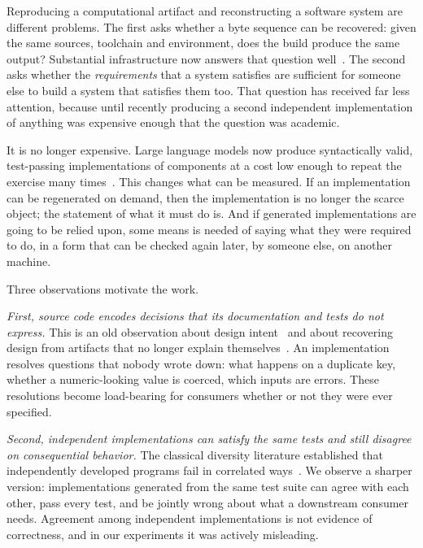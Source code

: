 \documentclass[10pt,twocolumn]{article}
\begin{document}
Reproducing a computational artifact and reconstructing a software system
are different problems. The first asks whether a byte sequence can be
recovered: given the same sources, toolchain and environment, does the
build produce the same output? Substantial infrastructure now answers
that question well~\cite{lamb2022,dolstra2004,courtes2013}. The second
asks whether the \emph{requirements} that a system satisfies are
sufficient for someone else to build a system that satisfies them too.
That question has received far less attention, because until recently
producing a second independent implementation of anything was expensive
enough that the question was academic.

It is no longer expensive. Large language models now produce syntactically
valid, test-passing implementations of components at a cost low enough to
repeat the exercise many times~\cite{chen2021,austin2021,jimenez2024}.
This changes what can be measured. If an implementation can be regenerated
on demand, then the implementation is no longer the scarce object; the
statement of what it must do is. And if generated implementations are
going to be relied upon, some means is needed of saying what they were
required to do, in a form that can be checked again later, by someone
else, on another machine.

Three observations motivate the work.

\emph{First, source code encodes decisions that its documentation and
tests do not express.} This is an old observation about design
intent~\cite{parnas1986} and about recovering design from artifacts
that no longer explain themselves~\cite{chikofsky1990}. An implementation
resolves questions that nobody wrote down: what happens on a duplicate
key, whether a numeric-looking value is coerced, which inputs are errors.
These resolutions become load-bearing for consumers whether or not they
were ever specified.

\emph{Second, independent implementations can satisfy the same tests and
still disagree on consequential behavior.} The classical diversity
literature established that independently developed programs fail in
correlated ways~\cite{knight1986,eckhardt1985,littlewood1989}. We observe
a sharper version: implementations generated from the same test suite can
agree with each other, pass every test, and be jointly wrong about what a
downstream consumer needs. Agreement among independent implementations is
not evidence of correctness, and in our experiments it was actively
misleading.
\end{document}
